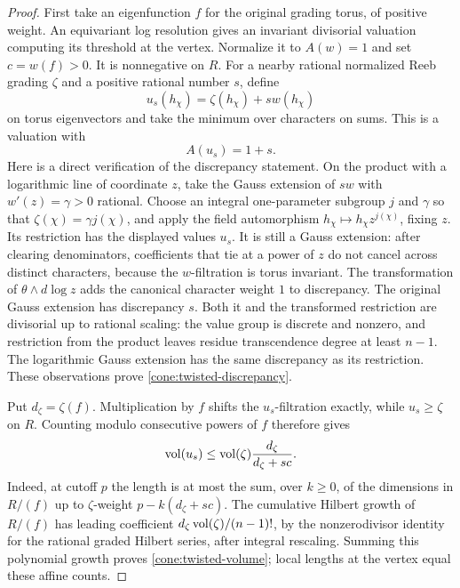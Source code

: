 \begin{proof}
First take an eigenfunction $f$ for the original grading torus, of
positive weight.  An equivariant log resolution gives an invariant
divisorial valuation computing its threshold at the vertex.  Normalize
it to $A(w)=1$ and set $c=w(f)>0$.  It is nonnegative on $R$.
For a nearby rational normalized Reeb grading $\zeta$ and a positive
rational number $s$, define
\[
 u_s(h_\chi)=\zeta(h_\chi)+s w(h_\chi)
\]
on torus eigenvectors and take the minimum over characters on sums.
This is a valuation with
\begin{equation}\label{cone:twisted-discrepancy}
 A(u_s)=1+s.
\end{equation}
Here is a direct verification of the discrepancy statement.  On the
product with a logarithmic line of coordinate $z$, take the Gauss
extension of $sw$ with $w'(z)=\gamma>0$ rational.  Choose an integral
one-parameter subgroup $j$ and $\gamma$ so that
$\zeta(\chi)=\gamma j(\chi)$, and apply the field automorphism
$h_\chi\mapsto h_\chi z^{j(\chi)}$, fixing $z$.  Its restriction has
the displayed values $u_s$.  It is still a Gauss extension: after
clearing denominators, coefficients that tie at a power of $z$ do not
cancel across distinct characters, because the $w$-filtration is torus
invariant.  The transformation of $\theta\wedge d\log z$ adds the
canonical character weight $1$ to discrepancy.  The original Gauss
extension has discrepancy $s$.  Both it and the transformed restriction
are divisorial up to rational scaling: the value group is discrete and
nonzero, and restriction from the product leaves residue transcendence
degree at least $n-1$.  The logarithmic Gauss extension has the same
discrepancy as its restriction.  These observations prove
\eqref{cone:twisted-discrepancy}.

Put $d_\zeta=\zeta(f)$.  Multiplication by $f$ shifts the $u_s$-filtration
exactly, while $u_s\geq\zeta$ on $R$.  Counting modulo consecutive
powers of $f$ therefore gives
\begin{equation}\label{cone:twisted-volume}
 \operatorname{vol}(u_s)\leq\operatorname{vol}(\zeta)
                \frac{d_\zeta}{d_\zeta+sc}.
\end{equation}
Indeed, at cutoff $p$ the length is at most the sum, over $k\geq0$, of
the dimensions in $R/(f)$ up to $\zeta$-weight
$p-k(d_\zeta+sc)$.  The cumulative Hilbert growth of $R/(f)$ has leading
coefficient $d_\zeta\operatorname{vol}(\zeta)/(n-1)!$, by the nonzerodivisor identity
for the rational graded Hilbert series, after integral rescaling.
Summing this polynomial growth proves \eqref{cone:twisted-volume};
local lengths at the vertex equal these affine counts.


\end{proof}
